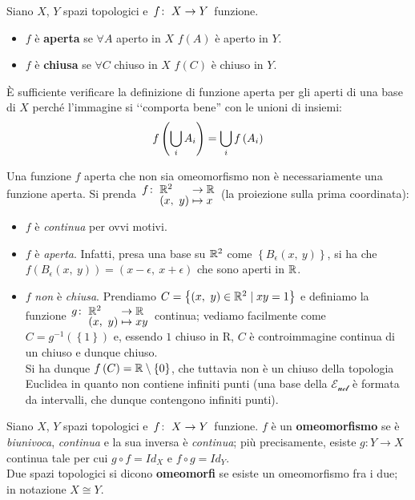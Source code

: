 \begin{define}
	Siano $X$, $Y$ spazi topologici e $\funz{f}{X}{Y}$ funzione.
	\begin{itemize}
		\item $f$ è \textbf{aperta} se $\forall A$ aperto in $X$ $f\left(A\right)$ è aperto in $Y$.
		\item $f$ è \textbf{chiusa} se $\forall C$ chiuso in $X$ $f\left(C\right)$ è chiuso in $Y$.
	\end{itemize}
\end{define}
\begin{observe}
	È sufficiente verificare la definizione di funzione aperta per gli aperti di una base di $X$ perché l'immagine si ‘‘comporta bene'' con le unioni di insiemi:
	\begin{equation*}
		f\left(\mathop{{\bigcup}}\displaylimits_{i}A_i\right)=\mathop{{\bigcup}}\displaylimits_{i}f\left(A_i\right)
	\end{equation*}
\end{observe}
\begin{attention}
	Una funzione $f$ aperta che non sia omeomorfismo non è necessariamente una funzione aperta. Si prenda $\funztot{f}{\realset^2}{\realset}{\left(x,\ y\right)}{x}$ (la proiezione sulla prima coordinata):
	\begin{itemize}
		\item $f$ è \textit{continua} per ovvi motivi.
		\item $f$ è \textit{aperta}. Infatti, presa una base su $\mathbb{R}^2$ come $\left\{B_{\epsilon}\left(x,\ y\right)\right\}$, si ha che $f\left(B_{\epsilon}\left(x,\ y\right)\right)=\left(x-\epsilon,\ x+\epsilon\right)$ che sono aperti in $\mathbb{R}$.
		\item $f$ \textit{non} è \textit{chiusa}. Prendiamo $C=\left\{\left(x,\ y\right)\in \mathbb{R}^2\mid xy=1 \right\}$ e definiamo la funzione $\funztot{g}{\realset^2}{\realset}{\left(x,\ y\right)}{xy}$ continua; vediamo facilmente come $C=g^{-1}\left(\left\{1\right\}\right)$ e, essendo ${1}$ chiuso in $\mathrm{R}$, $C$ è controimmagine continua di un chiuso e dunque chiuso.\\
		Si ha dunque $f\left(C\right)=\mathbb{R}\setminus\left\{0\right\}$, che tuttavia non è un chiuso della topologia Euclidea in quanto non contiene infiniti punti (una base della $\mathcal{E_{ucl}}$ è formata da intervalli, che dunque contengono infiniti punti).
	\end{itemize}
\end{attention}
\begin{define}
	Siano $X$, $Y$ spazi topologici e $\funz{f}{X}{Y}$ funzione. $f$ è un \textbf{omeomorfismo} se è \textit{biunivoca}, \textit{continua} e la sua inversa è \textit{continua}; più precisamente, esiste $g\colon Y\rightarrow X$ continua tale per cui $g\circ f = Id_{X}$ e $f\circ g = Id_{Y}$.\\
	Due spazi topologici si dicono \textbf{omeomorfi} se esiste un omeomorfismo fra i due; in notazione $X\cong Y$.
\end{define}
